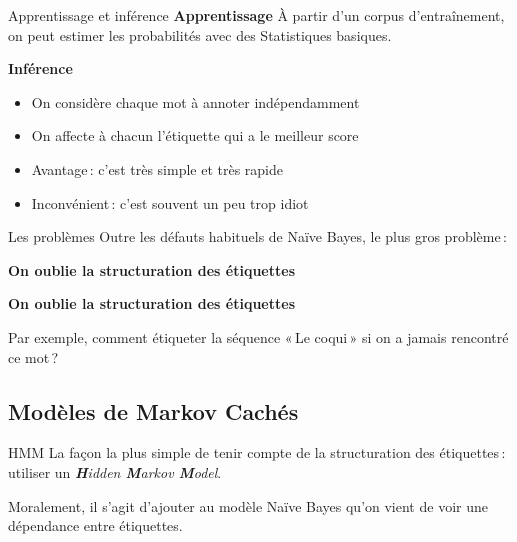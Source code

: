 \documentclass[hyperref={unicode}, xcolor={svgnames}, french]{beamer}
\begin{document}
\begin{frame}{Apprentissage et inférence}
	\textbf{Apprentissage} À partir d'un corpus d'entraînement, on peut estimer les probabilités avec des Statistiques basiques.

	\textbf{Inférence}
	\begin{itemize}
		\item On considère chaque mot à annoter indépendamment
		\item On affecte à chacun l'étiquette qui a le meilleur score
	\end{itemize}

	\begin{itemize}
		\item Avantage : c'est très simple et très rapide
		\item Inconvénient : c'est souvent un peu trop idiot
	\end{itemize}
\end{frame}

\begin{frame}{Les problèmes}
	Outre les défauts habituels de Naïve Bayes, le plus gros problème :

	\vspace{\bigskipamount}
	\begin{overprint}
			\begin{center}
				\Huge
				\textbf{On oublie la structuration des étiquettes}
			\end{center}
			\begin{center}
				\textbf{On oublie la structuration des étiquettes}
			\end{center}

			Par exemple, comment étiqueter la séquence « Le coqui » si on a jamais rencontré ce mot ?

	\end{overprint}
\end{frame}

\subsection{Modèles de Markov Cachés}
\begin{frame}{HMM}
	La façon la plus simple de tenir compte de la structuration des étiquettes : utiliser un \alert{\textit{\textbf{H}idden \textbf{M}arkov \textbf{M}odel}}.

	Moralement, il s'agit d'ajouter au modèle Naïve Bayes qu'on vient de voir une dépendance entre étiquettes.
\end{frame}
\end{document}
